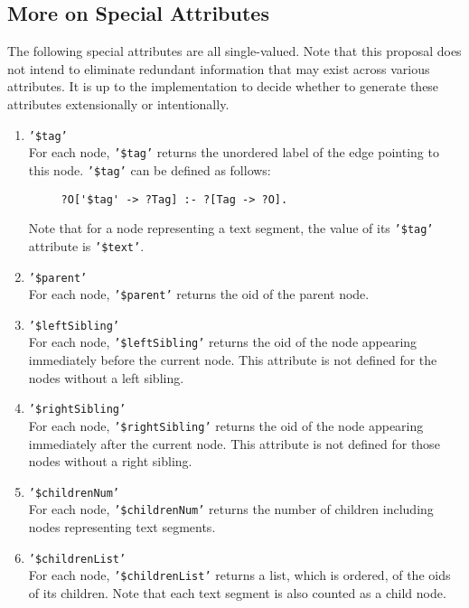 \subsection{More on Special Attributes}

The following special attributes are all single-valued.  Note that
this proposal does not intend to eliminate redundant information that
may exist across various attributes. It is up to the implementation to
decide whether to generate these attributes extensionally or
intentionally.

\begin{enumerate}
\item {\tt '\$tag'} \\
For each node, {\tt '\$tag'}  returns the unordered label of the edge
pointing to this node. {\tt '\$tag'}  can be defined as follows:
  \begin{verbatim}
     ?O['$tag' -> ?Tag] :- ?[Tag -> ?O].
  \end{verbatim}
Note that for a node representing a text segment, the value of
its {\tt '\$tag'}  attribute is {\tt '\$text'}. 

\item {\tt '\$parent'} \\
For each node, {\tt '\$parent'}  returns the oid of the parent node.

\item {\tt '\$leftSibling'} \\
For each node, {\tt '\$leftSibling'}  returns the oid of the node appearing
immediately before the current node. This attribute is not defined
for the nodes without a left sibling.

\item {\tt '\$rightSibling'} \\
For each node, {\tt '\$rightSibling'}  returns the oid of the node appearing
immediately after the current node. This attribute is not defined
for those nodes without a right sibling.

\item {\tt '\$childrenNum'} \\
For each node, {\tt '\$childrenNum'}  returns the number of children including
nodes representing text segments.

\item {\tt '\$childrenList'} \\
For each node, {\tt '\$childrenList'}  returns a list, which is ordered, of the
oids of its children. Note that each text segment is also counted
as a child node.


\end{enumerate}
